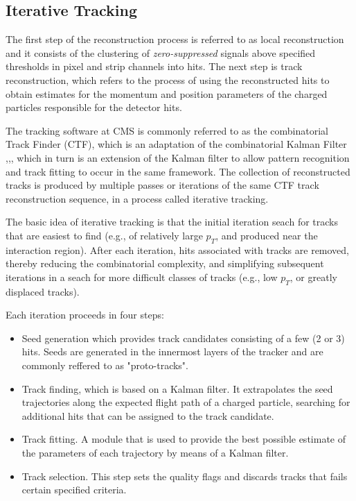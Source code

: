 \subsection{Iterative Tracking}

 The first step of the reconstruction process is referred to as local reconstruction and it consists of the clustering of \textit{zero-suppressed} signals above specified thresholds in pixel and strip channels into hits. The next step is track reconstruction, which refers to the process of using the reconstructed hits to obtain estimates for the momentum and position parameters of the charged particles responsible for the detector hits. 

 The tracking software at CMS\cite{TRK-11-001} is commonly referred to as the combinatorial Track Finder (CTF), which is an adaptation of the combinatorial Kalman Filter \cite{Billoir:1989mh},\cite{BILLOIR1990219},\cite{Mankel:1997dy}, which in turn is an extension of the Kalman filter\cite{Fruhwirth:1987fm} to allow pattern recognition and track fitting to occur in the same framework. The collection of reconstructed tracks is produced by multiple passes or iterations of the same CTF track reconstruction sequence, in a process called iterative tracking. 

The basic idea of iterative tracking is that the initial iteration seach for tracks that are easiest to find (e.g., of relatively large $p_{T}$, and produced near the interaction region). After each iteration, hits associated with tracks are removed, thereby reducing the combinatorial complexity, and simplifying subsequent iterations in a seach for more difficult classes of tracks (e.g., low $p_{T}$, or greatly displaced tracks).

Each iteration proceeds in four steps:

\begin{itemize}
	\item Seed generation which provides track candidates consisting of a few (2 or 3) hits. Seeds are generated in the innermost layers of the tracker and are commonly reffered to as "proto-tracks".
	\item Track finding, which is based on a Kalman filter. It extrapolates the seed trajectories along the expected flight path of a charged particle, searching for additional hits that can be assigned to the track candidate.
	\item Track fitting. A module that is used to provide the best possible estimate of the parameters of each trajectory by means of a Kalman filter.
	\item Track selection. This step sets the quality flags and discards tracks that fails certain specified criteria.
\end{itemize}

